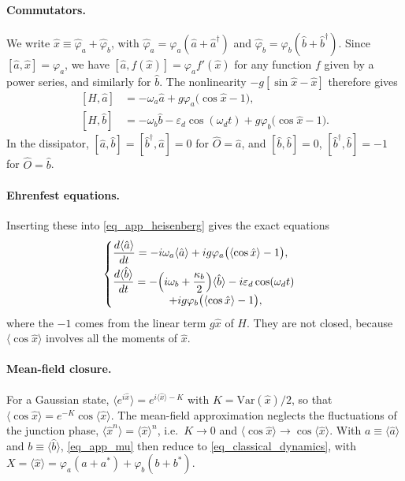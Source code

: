 \documentclass[aps,prx,reprint,floatfix,amsmath,amssymb,longbibliography]{revtex4-2}
\newcommand{\eps}{\varepsilon}
\newcommand{\da}{^\dagger}
\newcommand{\ha}{\hat{a}}
\newcommand{\hb}{\hat{b}}
\begin{document}
\paragraph*{Commutators.}
We write $\hat x\equiv\hat\varphi_a+\hat\varphi_b$, with $\hat\varphi_a=\varphi_a(\ha+\ha\da)$ and $\hat\varphi_b=\varphi_b(\hb+\hb\da)$. Since $[\ha,\hat x]=\varphi_a$, we have $[\ha,f(\hat x)]=\varphi_a f'(\hat x)$ for any function $f$ given by a power series, and similarly for $\hb$. The nonlinearity $-g[\sin\hat x-\hat x]$ therefore gives
\begin{equation}
\begin{aligned}
    [H,\ha] &= -\omega_a\ha + g\varphi_a\bigl(\cos\hat x-1\bigr),\\
    [H,\hb] &= -\omega_b\hb - \eps_d\cos(\omega_d t) + g\varphi_b\bigl(\cos\hat x-1\bigr).
\end{aligned}
\end{equation}
In the dissipator, $[\ha,\hb]=[\hb\da,\ha]=0$ for $\hat O=\ha$, and $[\hb,\hb]=0$, $[\hb\da,\hb]=-1$ for $\hat O=\hb$.

\paragraph*{Ehrenfest equations.}
Inserting these into \cref{eq_app_heisenberg} gives the exact equations
\begin{equation}
\begin{cases}
    \dfrac{d\langle\ha\rangle}{dt} = -i\omega_a\langle\ha\rangle+ig\varphi_a\bigl(\langle\cos\hat x\rangle-1\bigr),\\[2mm]
    \dfrac{d\langle\hb\rangle}{dt} = -\Bigl(i\omega_b+\dfrac{\kappa_b}{2}\Bigr)\langle\hb\rangle-i\eps_d\cos(\omega_d t)\\
    \hspace{18mm}+ig\varphi_b\bigl(\langle\cos\hat x\rangle-1\bigr),
\end{cases}
\label{eq_app_mu}
\end{equation}
where the $-1$ comes from the linear term $g\hat x$ of $H$. They are not closed, because $\langle\cos\hat x\rangle$ involves all the moments of $\hat x$.

\paragraph*{Mean-field closure.}
For a Gaussian state, $\langle e^{i\hat x}\rangle=e^{i\langle\hat x\rangle-K}$ with $K=\mathrm{Var}(\hat x)/2$, so that $\langle\cos\hat x\rangle=e^{-K}\cos\langle\hat x\rangle$. The mean-field approximation neglects the fluctuations of the junction phase, $\langle\hat x^n\rangle=\langle\hat x\rangle^n$, i.e.\ $K\to0$ and $\langle\cos\hat x\rangle\to\cos\langle\hat x\rangle$. With $a\equiv\langle\ha\rangle$ and $b\equiv\langle\hb\rangle$, \cref{eq_app_mu} then reduce to \cref{eq_classical_dynamics}, with $X=\langle\hat x\rangle=\varphi_a(a+a^*)+\varphi_b(b+b^*)$.
\end{document}
